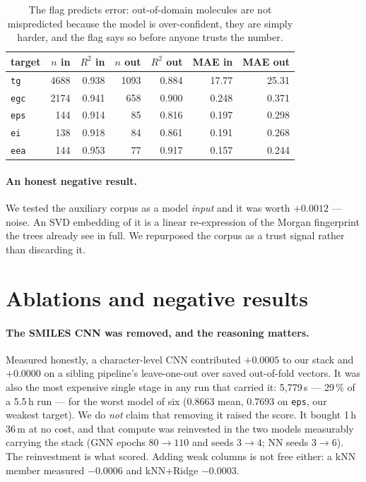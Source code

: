 \documentclass[11pt,a4paper]{article}
\newcommand{\prop}[1]{\texttt{#1}}
\newcommand{\R}{$R^2$}
\begin{document}
\begin{table}[h]
\centering
\small
\begin{tabular}{lrrrrrr}
\toprule
target & $n$ in & \R{} in & $n$ out & \R{} out & MAE in & MAE out \\
\midrule
\prop{tg}  & 4688 & 0.938 & 1093 & 0.884 & 17.77 & 25.31 \\
\prop{egc} & 2174 & 0.941 &  658 & 0.900 & 0.248 & 0.371 \\
\prop{eps} &  144 & 0.914 &   85 & 0.816 & 0.197 & 0.298 \\
\prop{ei}  &  138 & 0.918 &   84 & 0.861 & 0.191 & 0.268 \\
\prop{eea} &  144 & 0.953 &   77 & 0.917 & 0.157 & 0.244 \\
\bottomrule
\end{tabular}
\caption{The flag predicts error: out-of-domain molecules are not mispredicted
because the model is over-confident, they are simply harder, and the flag says so
before anyone trusts the number.}
\end{table}

\paragraph{An honest negative result.} We tested the auxiliary corpus as a model
\emph{input} and it was worth $+0.0012$ --- noise. An SVD embedding of it is a
linear re-expression of the Morgan fingerprint the trees already see in full. We
repurposed the corpus as a trust signal rather than discarding it.

\section{Ablations and negative results}

\paragraph{The SMILES CNN was removed, and the reasoning matters.} Measured
honestly, a character-level CNN contributed $+0.0005$ to our stack and
$+0.0000$ on a sibling pipeline's leave-one-out over saved out-of-fold vectors.
It was also the most expensive single stage in any run that carried it:
5{,}779\,s --- 29\,\% of a 5.5\,h run --- for the worst model of six (0.8663
mean, 0.7693 on \prop{eps}, our weakest target). We do \emph{not} claim that
removing it raised the score. It bought 1\,h\,36\,m at no cost, and that compute
was reinvested in the two models measurably carrying the stack (GNN epochs
$80 \rightarrow 110$ and seeds $3 \rightarrow 4$; NN seeds $3 \rightarrow 6$).
The reinvestment is what scored. Adding weak columns is not free either: a kNN
member measured $-0.0006$ and kNN$+$Ridge $-0.0003$.
\end{document}
